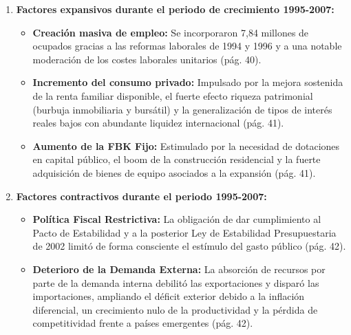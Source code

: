 \begin{enumerate}[label=\arabic*.]
    \item \textbf{Factores expansivos durante el periodo de crecimiento 1995-2007:}
    \begin{itemize}
        \item \textbf{Creación masiva de empleo:} Se incorporaron 7,84 millones de ocupados gracias a las reformas laborales de 1994 y 1996 y a una notable moderación de los costes laborales unitarios (pág. 40).
        \item \textbf{Incremento del consumo privado:} Impulsado por la mejora sostenida de la renta familiar disponible, el fuerte efecto riqueza patrimonial (burbuja inmobiliaria y bursátil) y la generalización de tipos de interés reales bajos con abundante liquidez internacional (pág. 41).
        \item \textbf{Aumento de la FBK Fijo:} Estimulado por la necesidad de dotaciones en capital público, el boom de la construcción residencial y la fuerte adquisición de bienes de equipo asociados a la expansión (pág. 41).
    \end{itemize}

    \item \textbf{Factores contractivos durante el periodo 1995-2007:}
    \begin{itemize}
        \item \textbf{Política Fiscal Restrictiva:} La obligación de dar cumplimiento al Pacto de Estabilidad y a la posterior Ley de Estabilidad Presupuestaria de 2002 limitó de forma consciente el estímulo del gasto público (pág. 42).
        \item \textbf{Deterioro de la Demanda Externa:} La absorción de recursos por parte de la demanda interna debilitó las exportaciones y disparó las importaciones, ampliando el déficit exterior debido a la inflación diferencial, un crecimiento nulo de la productividad y la pérdida de competitividad frente a países emergentes (pág. 42).
    \end{itemize}


\end{enumerate}
